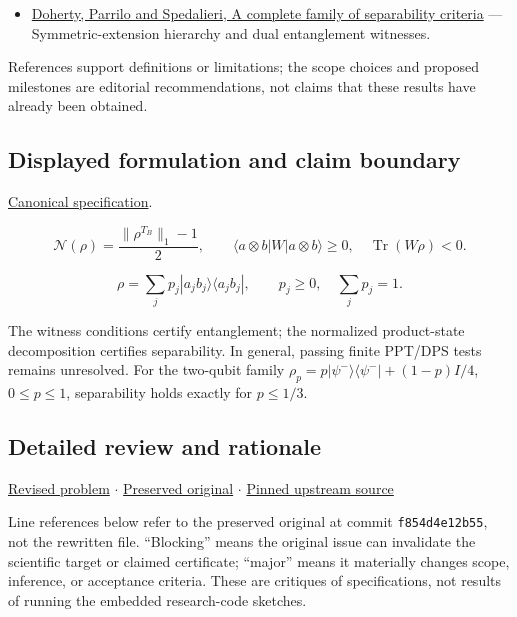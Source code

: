 \documentclass[
  11pt,
]{article}
\providecommand{\tightlist}{%
  \setlength{\itemsep}{0pt}\setlength{\parskip}{0pt}}
\begin{document}
\begin{itemize}
\tightlist
\item
  \href{https://arxiv.org/abs/quant-ph/0308032}{Doherty, Parrilo and
  Spedalieri, A complete family of separability criteria} ---
  Symmetric-extension hierarchy and dual entanglement witnesses.
\end{itemize}

References support definitions or limitations; the scope choices and
proposed milestones are editorial recommendations, not claims that these
results have already been obtained.

\subsection{Displayed formulation and claim boundary}

\href{https://github.com/rick-stevens-ai/Pure-Thought/blob/main/PRDs/23-Entanglement-Measures-Witnesses.md}{Canonical
specification}.

\[\mathcal N(\rho)=\frac{\|\rho^{T_B}\|_1-1}{2},\qquad
\langle a\otimes b|W|a\otimes b\rangle\ge0,\quad \operatorname{Tr}(W\rho)<0.\]

\[\rho=\sum_jp_j|a_jb_j\rangle\langle a_jb_j|,
\qquad p_j\ge0,\quad\sum_jp_j=1.\]

The witness conditions certify entanglement; the normalized
product-state decomposition certifies separability. In general, passing
finite PPT/DPS tests remains unresolved. For the two-qubit family
\(\rho_p=p|\psi^-\rangle\langle\psi^-|+(1-p)I/4\), \(0\le p\le1\),
separability holds exactly for \(p\le1/3\).

\subsection{Detailed review and rationale}

\href{https://github.com/rick-stevens-ai/Pure-Thought/blob/main/PRDs/23-Entanglement-Measures-Witnesses.md}{Revised
problem} \ensuremath{\cdot}
\href{https://github.com/rick-stevens-ai/Pure-Thought/blob/main/archive/original-PRDs/23-Entanglement-Measures-Witnesses.md}{Preserved
original} \ensuremath{\cdot}
\href{https://github.com/rick-stevens-ai/Pure-Thought/blob/f854d4e12b55c1f5b5c2a964b75f2d23496d981e/PRDs/23-Entanglement-Measures-Witnesses.md}{Pinned
upstream source}

Line references below refer to the preserved original at commit
\texttt{f854d4e12b55}, not the rewritten file. ``Blocking'' means the
original issue can invalidate the scientific target or claimed
certificate; ``major'' means it materially changes scope, inference, or
acceptance criteria. These are critiques of specifications, not results
of running the embedded research-code sketches.
\end{document}
